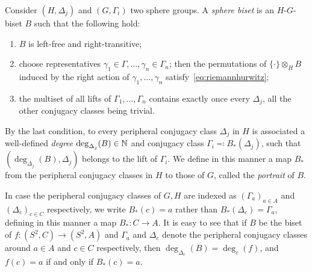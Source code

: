 \documentclass{amsart}
\begin{document}
\begin{defn}\label{dfn:SphBis}
  Consider $(H,\Delta_j)$ and $(G,\Gamma_i)$ two sphere groups. A
  \emph{sphere biset} is an $H$-$G$-biset $B$ such that the following
  hold:
  \begin{enumerate}\renewcommand\theenumi{SB\ensuremath{{}_\arabic{enumi}}}
  \item $B$ is left-free and right-transitive;\label{cond:1:dfn:SphBis}
  \item choose representatives
    $\gamma_1\in\Gamma,\dots,\gamma_n\in\Gamma_n$; then the
    permutations of $\{\cdot\}\otimes_H B$ induced by the right action
    of $\gamma_1,\dots,\gamma_n$
    satisfy~\eqref{eq:riemannhurwitz};\label{cond:2:dfn:SphBis}
  \item the multiset of all lifts of $\Gamma_1,\dots,\Gamma_n$
    contains exactly once every $\Delta_j$, all the other conjugacy
    classes being trivial.
   \label{cond:3:dfn:SphBis} 
  \end{enumerate}
  By the last condition, to every peripheral conjugacy class
  $\Delta_j$ in $H$ is associated a well-defined \emph{degree}
  $\deg_{\Delta_j}(B)\in{\mathbb N}$ and conjugacy class
  $\Gamma_i\eqqcolon B_*(\Delta_j)$, such that
  $(\deg_{\Delta_j}(B),\Delta_j)$ belongs to the lift of
  $\Gamma_i$. We define in this manner a map $B_*$ from the peripheral
  conjugacy classes in $H$ to those of $G$, called the \emph{portrait}
  of $B$.
\end{defn}
In case the peripheral conjugacy classes of $G,H$ are indexed as
$(\Gamma_a)_{a\in A}$ and $(\Delta_c)_{c\in C}$ respectively, we write
$B_*(c)=a$ rather than $B_*(\Delta_c)=\Gamma_a$, defining in this
manner a map $B_*\colon C\to A$. It is easy to see that if $B$ be the
biset of $f\colon (S^2,C)\to (S^2,A)$ and $\Gamma_a$ and $\Delta_c$
denote the peripheral conjugacy classes around $a\in A$ and $c\in C$
respectively, then $\deg_{\Delta_c}(B)=\deg_{c}(f)$, and $f(c)=a$ if
and only if $B_*(c)=a$.
\end{document}
